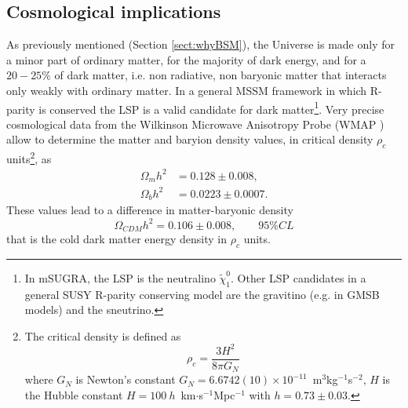 \subsection{Cosmological implications}
As previously mentioned (Section \ref{sect:whyBSM}), the Universe is made only for a minor part of ordinary matter, for the majority of dark energy, and for a $20-25\%$ of dark matter, i.e. non radiative, non baryonic matter that interacts only weakly with ordinary matter. In a general MSSM framework in which R-parity is conserved the LSP is a valid candidate for dark matter\footnote{In mSUGRA, the LSP is the neutralino $\tilde{\chi}^{0}_{1}$. Other LSP candidates in a general SUSY R-parity conserving model are the gravitino (e.g. in GMSB models) and the sneutrino.}. Very precise cosmological data from the Wilkinson Microwave Anisotropy Probe (WMAP \cite{spergel-2007-170}) allow to determine the matter and baryion density values, in critical density $\rho_c$ units\footnote{The critical density is defined as $$\rho_c = \dfrac{3H^2}{8\pi G_N}$$ where $G_N$ is Newton's constant $G_N=6.6742(10)\times 10^{-11}$~m$^3$kg$^{-1}$s$^{-2}$, $H$ is the Hubble constant $H=100\ h$~km$\cdot$s$^{-1}$Mpc$^{-1}$ with $h=0.73\pm0.03$.}, as \cite{pdg2008} \begin{align}
\Omega_m h^2 &= 0.128\pm0.008, \\
\Omega_b h^2 &= 0.0223\pm0.0007 . \end{align} These values lead to a difference in matter-baryonic density \begin{equation}
\Omega_{CDM} h^2 = 0.106\pm0.008, \qquad 95\% CL
\end{equation} that is the cold dark matter energy density in $\rho_c$ units.

